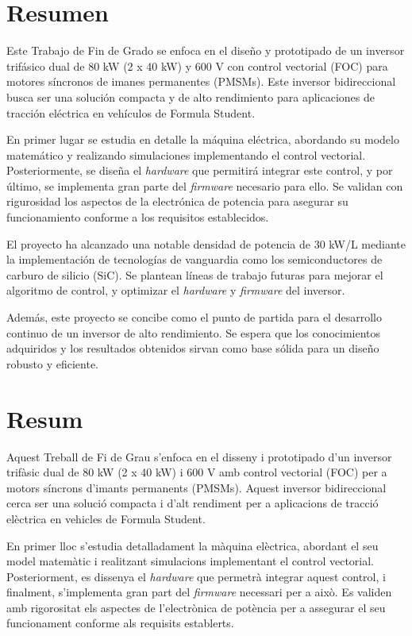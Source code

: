 \chapter*{Resumen}
Este Trabajo de Fin de Grado se enfoca en el diseño y prototipado de un inversor trifásico dual de 80 kW (2 x 40 kW) y 600 V con control vectorial (FOC) para motores síncronos de imanes permanentes (PMSMs). Este inversor bidireccional busca ser una solución compacta y de alto rendimiento para aplicaciones de tracción eléctrica en vehículos de Formula Student.

En primer lugar se estudia en detalle la máquina eléctrica, abordando su modelo matemático y realizando simulaciones implementando el control vectorial. Posteriormente, se diseña el \textit{hardware} que permitirá integrar este control, y por último, se implementa gran parte del \textit{firmware} necesario para ello. Se validan con rigurosidad los aspectos de la electrónica de potencia para asegurar su funcionamiento conforme a los requisitos establecidos.

El proyecto ha alcanzado una notable densidad de potencia de 30 kW/L mediante la implementación de tecnologías de vanguardia como los semiconductores de carburo de silicio (SiC). Se plantean líneas de trabajo futuras para mejorar el algoritmo de control, y optimizar el \textit{hardware} y \textit{firmware} del inversor.

Además, este proyecto se concibe como el punto de partida para el desarrollo continuo de un inversor de alto rendimiento. Se espera que los conocimientos adquiridos y los resultados obtenidos sirvan como base sólida para un diseño robusto y eficiente.

\chapter*{Resum}
Aquest Treball de Fi de Grau s'enfoca en el disseny i prototipado d'un inversor trifàsic dual de 80 kW (2 x 40 kW) i 600 V amb control vectorial (FOC) per a motors síncrons d'imants permanents (PMSMs). Aquest inversor bidireccional cerca ser una solució compacta i d'alt rendiment per a aplicacions de tracció elèctrica en vehicles de Formula Student.

En primer lloc s'estudia detalladament la màquina elèctrica, abordant el seu model matemàtic i realitzant simulacions implementant el control vectorial. Posteriorment, es dissenya el \textit{hardware} que permetrà integrar aquest control, i finalment, s'implementa gran part del \textit{firmware} necessari per a això. Es validen amb rigorositat els aspectes de l'electrònica de potència per a assegurar el seu funcionament conforme als requisits establerts.

